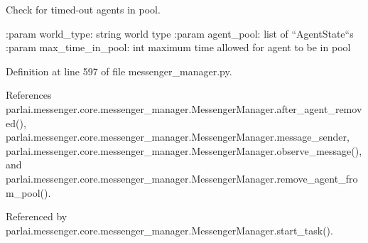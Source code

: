 \begin{DoxyVerb}Check for timed-out agents in pool.

:param world_type:
    string world type
:param agent_pool:
    list of ``AgentState``s
:param max_time_in_pool:
    int maximum time allowed for agent to be in pool
\end{DoxyVerb}
 

Definition at line 597 of file messenger\+\_\+manager.\+py.



References parlai.\+messenger.\+core.\+messenger\+\_\+manager.\+Messenger\+Manager.\+after\+\_\+agent\+\_\+removed(), parlai.\+messenger.\+core.\+messenger\+\_\+manager.\+Messenger\+Manager.\+message\+\_\+sender, parlai.\+messenger.\+core.\+messenger\+\_\+manager.\+Messenger\+Manager.\+observe\+\_\+message(), and parlai.\+messenger.\+core.\+messenger\+\_\+manager.\+Messenger\+Manager.\+remove\+\_\+agent\+\_\+from\+\_\+pool().



Referenced by parlai.\+messenger.\+core.\+messenger\+\_\+manager.\+Messenger\+Manager.\+start\+\_\+task().

